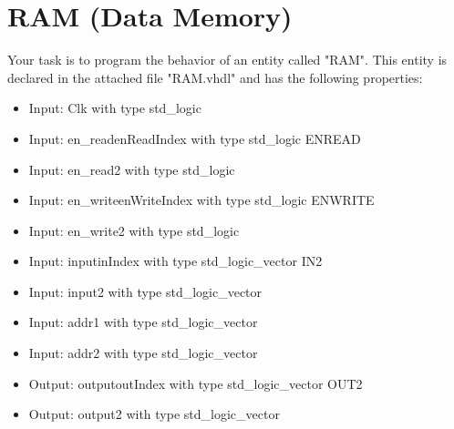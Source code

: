 \documentclass[a4paper,12pt]{article}
\begin{document}
\pagestyle{empty}
\setlength{\parindent}{0em}
\section*{RAM (Data Memory)}

Your task is to program the behavior of an entity called "RAM". This entity is declared in the attached file "RAM.vhdl" and has the following properties:
\begin{itemize}
\item Input:  Clk with type std\_logic
\item Input:  en\_read{{enReadIndex}} with type std\_logic
{{ENREAD}}\item Input:  en\_read2 with type std\_logic
\item Input:  en\_write{{enWriteIndex}} with type std\_logic
{{ENWRITE}}\item Input:  en\_write2 with type std\_logic
\item Input:  input{{inIndex}} with type std\_logic\_vector
{{IN2}}\item Input:  input2 with type std\_logic\_vector
\item Input:  addr1 with type std\_logic\_vector
\item Input:  addr2 with type std\_logic\_vector
\item Output: output{{outIndex}} with type std\_logic\_vector
{{OUT2}}\item Output: output2 with type std\_logic\_vector
\end{itemize}
\end{document}
